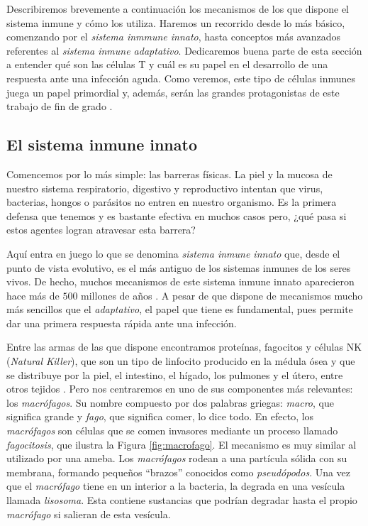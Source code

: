 Describiremos brevemente a continuación los mecanismos de los que dispone el sistema inmune y cómo los utiliza. Haremos un recorrido desde lo más básico, comenzando por el \textit{sistema inmmune innato}, hasta conceptos más avanzados referentes al \textit{sistema inmune adaptativo}. Dedicaremos buena parte de esta sección a entender qué son las células T y cuál es su papel en el desarrollo de una respuesta ante una infección aguda. Como veremos, este tipo de células inmunes juega un papel primordial y, además, serán las grandes protagonistas de este trabajo de fin de grado \citep{JTB}.  

\subsection{El sistema inmune innato}
\label{sub:sistInmInnato}

Comencemos por lo más simple: las barreras físicas. La piel y la mucosa de nuestro sistema respiratorio, digestivo y reproductivo intentan que virus, bacterias, hongos o parásitos no entren en nuestro organismo. Es la primera defensa que tenemos y es bastante efectiva en muchos casos pero, ¿qué pasa si estos agentes logran atravesar esta barrera?

Aquí entra en juego lo que se denomina \textit{sistema inmune innato} que, desde el punto de vista evolutivo, es el más antiguo de los sistemas inmunes de los seres vivos. De hecho, muchos mecanismos de este sistema inmune innato aparecieron hace más de $500$ millones de años \citep{theHowItWorks}. A pesar de que dispone de mecanismos mucho más sencillos que el \textit{adaptativo}, el papel que tiene es fundamental, pues permite dar una primera respuesta rápida ante una infección. 

Entre las armas de las que dispone encontramos proteínas, fagocitos y células NK (\textit{Natural Killer}), que son un tipo de linfocito producido en la médula ósea y que se distribuye por la piel, el intestino, el hígado, los pulmones y el útero, entre otros tejidos \citep{celulasNK}. Pero nos centraremos en uno de sus componentes más relevantes: los \textit{macrófagos}. Su nombre compuesto por dos palabras griegas: \textit{macro}, que significa grande y \textit{fago}, que significa comer, lo dice todo. En efecto, los \textit{macrófagos} son células que se comen invasores mediante un proceso llamado \textit{fagocitosis}, que ilustra la Figura \ref{fig:macrofago}. El mecanismo es muy similar al utilizado por una ameba. Los \textit{macrófagos} rodean a una partícula sólida con su membrana, formando pequeños ``brazos'' conocidos como \textit{pseudópodos}. Una vez que el \textit{macrófago} tiene en un interior a la bacteria, la degrada en una vesícula llamada \textit{lisosoma}. Esta contiene sustancias que podrían degradar hasta el propio \textit{macrófago} si salieran de esta vesícula. 


